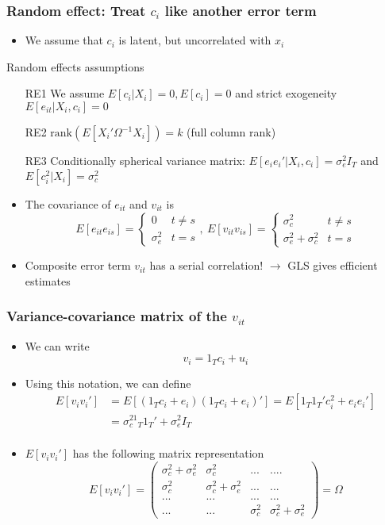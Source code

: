 \documentclass[aspectratio=169]{beamer}
\begin{document}
\begin{frame}
\frametitle{Random effect: Treat $c_i$ like another error term}
\begin{itemize}
\item We assume that $c_i$ is latent, but uncorrelated with $x_i$
\end{itemize}
\begin{block}{Random effects assumptions}
\begin{itemize}
\item[RE1] We assume $E[c_i|X_i]=0, E[c_i]=0$ and strict exogeneity $E[e_{it}|X_i,c_i]=0$
\item[RE2] $\text{rank}\left(E [X_i' \Omega^{-1}X_i]\right)=k$ (full column rank)
\item[RE3] Conditionally spherical variance matrix: $E[e_ie_i'|X_i,c_i]=\sigma_e^2 I_T$ and $E[c_i^2|X_i]=\sigma_c^2$
\end{itemize}
\end{block}
\begin{itemize}
\item The covariance of $e_{it}$ and $v_{it}$ is
\[
E[e_{it}e_{is}]=\begin{cases} 0 & t\neq s \\ \sigma_e^2 & t=s \end{cases},\ E[v_{it}v_{is}]=\begin{cases} \sigma_c^2 & t\neq s \\ \sigma_e^2+\sigma_c^2 & t=s \end{cases}
\]
\item Composite error term $v_{it}$ has a serial correlation! $\to$ GLS gives efficient estimates
\end{itemize}
\end{frame}

\begin{frame}
\frametitle{Variance-covariance matrix of the $v_{it}$}
\begin{itemize}
\item We can write
\[
v_i = 1_Tc_i + u_i
\]
\item Using this notation, we can define
\[
\begin{aligned}
E[v_iv_i']&=E\left[(1_Tc_i + e_i)(1_Tc_i + e_i)'\right]=E[1_T1_T'c_i^2+e_ie_i']\\
&=\sigma_c^21_T1_T'+\sigma_e^2I_T\\
\end{aligned}
\]
\item  $E[v_iv_i']$ has the following matrix representation
\[
E[v_iv_i']=\begin{pmatrix}\sigma_c^2+\sigma_e^2 & \sigma_c^2 & ... &.... \\ \sigma_c^2 & \sigma_c^2+\sigma_e^2 &...&...\\ ...&...&...&...\\ ... &...&\sigma_c^2&\sigma_c^2+\sigma_e^2\end{pmatrix} =\Omega
\]

\end{itemize}
\end{frame}
\end{document}
